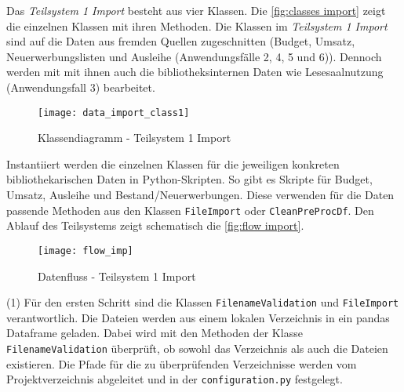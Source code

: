     Das \textit{Teilsystem 1 Import} besteht aus vier Klassen. Die \autoref{fig:classes import} zeigt die einzelnen Klassen mit ihren Methoden.
    Die Klassen im \textit{Teilsystem 1 Import} sind auf die Daten aus fremden Quellen zugeschnitten
    (Budget, Umsatz, Neuerwerbungslisten und Ausleihe (Anwendungsfälle 2, 4, 5 und 6)). Dennoch werden mit mit ihnen auch die bibliotheksinternen Daten
    wie Lesesaalnutzung (Anwendungsfall 3) bearbeitet. 
    \begin{figure}[H]
        \centering
            \texttt{[image: data\_import\_class1]}
            \caption{Klassendiagramm - Teilsystem 1 Import}
            \label{fig:classes import}
    \end{figure}

    Instantiiert werden die einzelnen Klassen für die jeweiligen konkreten bibliothekarischen Daten in Python-Skripten. 
    So gibt es Skripte für Budget, Umsatz, Ausleihe und Bestand/Neuerwerbungen. Diese verwenden für die Daten passende Methoden
    aus den Klassen \texttt{FileImport} oder \texttt{CleanPreProcDf}.
    Den Ablauf des Teilsystems zeigt schematisch die \autoref{fig:flow import}.

    \begin{figure}[H]
        \centering
            \texttt{[image: flow\_imp]}
            \caption{Datenfluss - Teilsystem 1 Import}
            \label{fig:flow import}
    \end{figure}

    
    (1) Für den ersten Schritt sind die Klassen \texttt{FilenameValidation} und \texttt{FileImport} verantwortlich.
    Die Dateien werden aus einem lokalen Verzeichnis in ein pandas Dataframe geladen. 
    Dabei wird mit den Methoden der Klasse \texttt{FilenameValidation} überprüft, ob sowohl das Verzeichnis als auch die Dateien existieren.
    Die Pfade für die zu überprüfenden Verzeichnisse werden vom Projektverzeichnis abgeleitet und in der \texttt{configuration.py} festgelegt.
    
